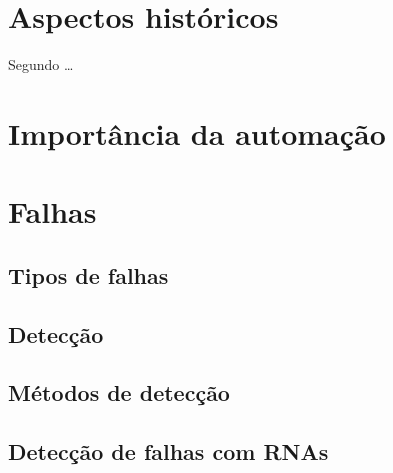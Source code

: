 \label{cap:introducao}

\section{Aspectos históricos}
Segundo \ldots



\section{Importância da automação}

\section{Falhas}

\subsection{Tipos de falhas}

\subsection{Detecção}

\subsection{Métodos de detecção}

\subsection{Detecção de falhas com RNAs}
